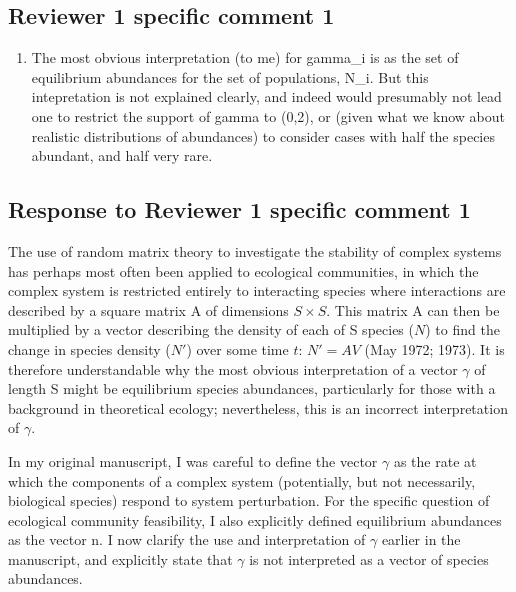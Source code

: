 \documentclass[]{article}
\providecommand{\tightlist}{%
  \setlength{\itemsep}{0pt}\setlength{\parskip}{0pt}}
\begin{document}
\subsection{Reviewer 1 specific comment
1}\label{reviewer-1-specific-comment-1}

\begin{enumerate}
\def\labelenumi{(\alph{enumi})}
\tightlist
\item
  The most obvious interpretation (to me) for gamma\_i is as the set of
  equilibrium abundances for the set of populations, N\_i. But this
  intepretation is not explained clearly, and indeed would presumably
  not lead one to restrict the support of gamma to (0,2), or (given what
  we know about realistic distributions of abundances) to consider cases
  with half the species abundant, and half very rare.
\end{enumerate}

\subsection{Response to Reviewer 1 specific comment
1}\label{response-to-reviewer-1-specific-comment-1}

The use of random matrix theory to investigate the stability of complex
systems has perhaps most often been applied to ecological communities,
in which the complex system is restricted entirely to interacting
species where interactions are described by a square matrix A of
dimensions \(S \times S\). This matrix A can then be multiplied by a
vector describing the density of each of S species (\(N\)) to find the
change in species density (\(N'\)) over some time \(t\): \(N' = AV\)
(May 1972; 1973). It is therefore understandable why the most obvious
interpretation of a vector \(\gamma\) of length S might be equilibrium
species abundances, particularly for those with a background in
theoretical ecology; nevertheless, this is an incorrect interpretation
of \(\gamma\).

In my original manuscript, I was careful to define the vector \(\gamma\)
as the rate at which the components of a complex system (potentially,
but not necessarily, biological species) respond to system perturbation.
For the specific question of ecological community feasibility, I also
explicitly defined equilibrium abundances as the vector n. I now clarify
the use and interpretation of \(\gamma\) earlier in the manuscript, and
explicitly state that \(\gamma\) is not interpreted as a vector of
species abundances.
\end{document}

